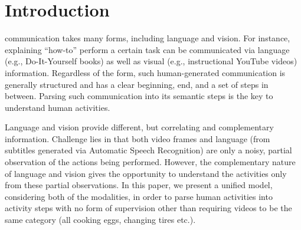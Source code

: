 
\section{Introduction}
 communication takes many forms, including language and vision. For instance, explaining ``how-to'' perform a certain task can be communicated via language (e.g., Do-It-Yourself books) as well as visual (e.g., instructional YouTube videos) information. Regardless of the form, such human-generated communication is generally structured and has a clear beginning, end, and a set of steps in between. Parsing such communication into its semantic steps is the key to understand human activities.

Language and vision provide different, but correlating and complementary information. Challenge lies in that both video frames and language (from subtitles generated via Automatic Speech Recognition) are only a noisy, partial observation of the actions being performed. However, the complementary nature of language and vision gives the opportunity to understand the activities only from these partial observations. In this paper, we present a unified model, considering both of the modalities, in order to parse human activities into activity steps with no form of supervision other than requiring videos to be the same category (\eg all cooking eggs, changing tires etc.).

%





